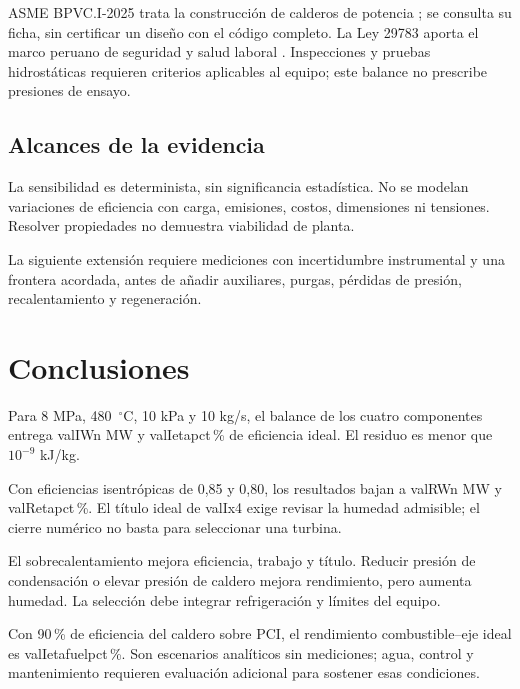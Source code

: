 \documentclass[conference,a4paper,11pt]{IEEEtran}
\newcommand{\V}[1]{\csname val#1\endcsname}
\begin{document}
ASME BPVC.I-2025 trata la construcción de calderos de potencia \cite{asme}; se consulta su ficha, sin certificar un diseño con el código completo. La Ley 29783 aporta el marco peruano de seguridad y salud laboral \cite{ley}. Inspecciones y pruebas hidrostáticas requieren criterios aplicables al equipo; este balance no prescribe presiones de ensayo.

\subsection{Alcances de la evidencia}
La sensibilidad es determinista, sin significancia estadística. No se modelan variaciones de eficiencia con carga, emisiones, costos, dimensiones ni tensiones. Resolver propiedades no demuestra viabilidad de planta.

La siguiente extensión requiere mediciones con incertidumbre instrumental y una frontera acordada, antes de añadir auxiliares, purgas, pérdidas de presión, recalentamiento y regeneración.

\section{Conclusiones}
Para 8 MPa, 480~$^\circ$C, 10 kPa y 10 kg/s, el balance de los cuatro componentes entrega \V{IWn} MW y \V{Ietapct}\,\% de eficiencia ideal. El residuo es menor que $10^{-9}$ kJ/kg.

Con eficiencias isentrópicas de 0,85 y 0,80, los resultados bajan a \V{RWn} MW y \V{Retapct}\,\%. El título ideal de \V{Ix4} exige revisar la humedad admisible; el cierre numérico no basta para seleccionar una turbina.

El sobrecalentamiento mejora eficiencia, trabajo y título. Reducir presión de condensación o elevar presión de caldero mejora rendimiento, pero aumenta humedad. La selección debe integrar refrigeración y límites del equipo.

Con 90\,\% de eficiencia del caldero sobre PCI, el rendimiento combustible--eje ideal es \V{Ietafuelpct}\,\%. Son escenarios analíticos sin mediciones; agua, control y mantenimiento requieren evaluación adicional para sostener esas condiciones.



\end{document}
